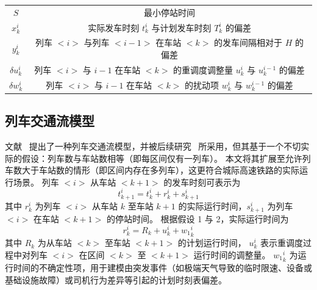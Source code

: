 \begin{table}
\begin{tabular}{cc}
        $S$ & 最小停站时间 \\
        
        $x_{k}^{i}$ & 实际发车时刻 $t_k^i$ 与计划发车时刻 $T_k^i$ 的偏差 \\
        
        $y_{k}^{i}$ & 列车 $<i>$ 与列车 $<i-1>$ 在车站 $<k>$ 的发车间隔相对于 $H$ 的偏差 \\
        
        $\delta u_{k}^{i}$ & 列车 $<i>$ 与 $i-1$ 在车站 $<k>$ 的重调度调整量 $u_k^i$ 与 $u_k^{i-1}$ 的偏差 \\
        
        $\delta w_{k}^{i}$ & 列车 $<i>$ 与 $i-1$ 在车站 $<k>$ 的扰动项 $w_k^i$ 与 $w_k^{i-1}$ 的偏差 \\
        
        \hline
    \end{tabular}
\end{table}

\subsection{列车交通流模型}
\label{2.B}
文献~\cite{b22} 提出了一种列车交通流模型，并被后续研究~\cite{b21} 所采用，但其基于一个不切实际的假设：列车数与车站数相等（即每区间仅有一列车）。
本文将其扩展至允许列车数大于车站数的情形（即区间内存在多列车），这更符合城际高速铁路的实际运行场景。
列车 $<i>$ 从车站 $<k+1>$ 的发车时刻可表示为
\begin{equation}
    t_{k+1}^{i}=t_{k}^{i}+r_{k}^{i}+s_{k+1}^{i} 
    \label{equ:equ1}
\end{equation}
其中 $r_{k}^{i}$ 为列车 $<i>$ 从车站 $k$ 至车站 $k+1$ 的实际运行时间，$s_{k+1}^{i}$ 为列车 $<i>$ 在车站 $<k+1>$ 的停站时间。
根据假设 1 与 2，实际运行时间为
\begin{equation}
    r_{k}^{i}=R_{k}+u_{k}^{i}+{w_1}_{k}^{i}
    \label{equ:equ2}
\end{equation}
其中 $R_{k}$ 为从车站 $<k>$ 至车站 $<k+1>$ 的计划运行时间，
$u_{k}^{i}$ 表示重调度过程中对列车 $<i>$ 在区间 $<k>$ 至 $<k+1>$ 运行时间的调整量。
${w_1}_{k}^{i}$ 为运行时间的不确定性项，用于建模由突发事件（如极端天气导致的临时限速、设备或基础设施故障）或司机行为差异等引起的计划时刻表偏差。

